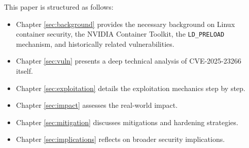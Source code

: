 \newpage
\medskip
\noindent This paper is structured as follows:
\begin{itemize}
    \item Chapter \ref{sec:background} provides the necessary background on Linux container security, the NVIDIA Container Toolkit, the \texttt{LD\_PRELOAD} mechanism, and historically related vulnerabilities.
    \item Chapter \ref{sec:vuln} presents a deep technical analysis of CVE-2025-23266 itself.
    \item Chapter \ref{sec:exploitation} details the exploitation mechanics step by step.
    \item Chapter \ref{sec:impact} assesses the real-world impact.
    \item Chapter \ref{sec:mitigation} discusses mitigations and hardening strategies.
    \item Chapter \ref{sec:implications} reflects on broader security implications.
\end{itemize}    